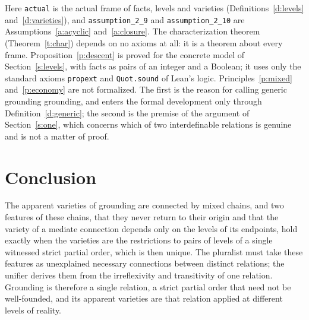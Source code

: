 \documentclass{situationist-preprint}
\begin{document}
\noindent Here \texttt{actual} is the actual frame of facts, levels and varieties (Definitions~\ref{d:levels} and~\ref{d:varieties}), and \texttt{assumption\_2\_9} and \texttt{assumption\_2\_10} are Assumptions~\ref{a:acyclic} and~\ref{a:closure}. The characterization theorem (Theorem~\ref{t:char}) depends on no axioms at all: it is a theorem about every frame. Proposition~\ref{p:descent} is proved for the concrete model of Section~\ref{s:levels}, with facts as pairs of an integer and a Boolean; it uses only the standard axioms \texttt{propext} and \texttt{Quot.sound} of Lean's logic. Principles~\ref{p:mixed} and~\ref{p:economy} are not formalized. The first is the reason for calling generic grounding grounding, and enters the formal development only through Definition~\ref{d:generic}; the second is the premise of the argument of Section~\ref{s:one}, which concerns which of two interdefinable relations is genuine and is not a matter of proof.

\section{Conclusion}\label{s:conclusion}

The apparent varieties of grounding are connected by mixed chains, and two features of these chains, that they never return to their origin and that the variety of a mediate connection depends only on the levels of its endpoints, hold exactly when the varieties are the restrictions to pairs of levels of a single witnessed strict partial order, which is then unique. The pluralist must take these features as unexplained necessary connections between distinct relations; the unifier derives them from the irreflexivity and transitivity of one relation. Grounding is therefore a single relation, a strict partial order that need not be well-founded, and its apparent varieties are that relation applied at different levels of reality.
\end{document}
